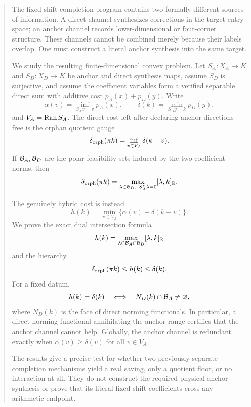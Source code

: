 \begin{abstract}
The fixed-shift completion program contains two formally different
sources of information.  A direct channel synthesizes corrections in
the target entry space; an anchor channel records lower-dimensional or
four-corner structure.  These channels cannot be combined merely
because their labels overlap.  One must construct a literal anchor
synthesis into the same target.

We study the resulting finite-dimensional convex problem.  Let
\(S_A:X_A\to K\) and \(S_D:X_D\to K\) be anchor and direct synthesis
maps, assume \(S_D\) is surjective, and assume the coefficient variables
form a verified separable direct sum with additive cost
\(p_A(x)+p_D(y)\).  Write
\[
 \alpha(v)=\inf_{S_Ax=v}p_A(x),
 \qquad
 \delta(k)=\min_{S_Dy=k}p_D(y),
\]
and \(V_A=\Ran S_A\).  The direct cost left after declaring anchor
directions free is the orphan quotient gauge
\[
 \delta_{\rm orph}(\pi k)
 =\inf_{v\in V_A}\delta(k-v).
\]
If \(\cB_A,\cB_D\) are the polar feasibility sets induced by the two
coefficient norms, then
\[
 \delta_{\rm orph}(\pi k)
 =
 \max_{\lambda\in\cB_D,\ S_A^*\lambda=0}
 [\lambda,k]_{\R}.
\]

The genuinely hybrid cost is instead
\[
 h(k)=\min_{v\in V_A}\{\alpha(v)+\delta(k-v)\}.
\]
We prove the exact dual intersection formula
\[
 h(k)
 =
 \max_{\lambda\in\cB_A\cap\cB_D}
 [\lambda,k]_{\R}
\]
and the hierarchy
\[
 \delta_{\rm orph}(\pi k)\le h(k)\le\delta(k).
\]
For a fixed datum,
\[
 h(k)=\delta(k)
 \quad\Longleftrightarrow\quad
 N_D(k)\cap\cB_A\ne\varnothing,
\]
where \(N_D(k)\) is the face of direct norming functionals.  In
particular, a direct norming functional annihilating the anchor range
certifies that the anchor channel cannot help.  Globally, the anchor
channel is redundant exactly when
\(\alpha(v)\ge\delta(v)\) for all \(v\in V_A\).

The results give a precise test for whether two previously separate
completion mechanisms yield a real saving, only a quotient floor, or
no interaction at all.  They do not construct the required physical
anchor synthesis or prove that its literal fixed-shift coefficients
cross any arithmetic endpoint.
\end{abstract}

